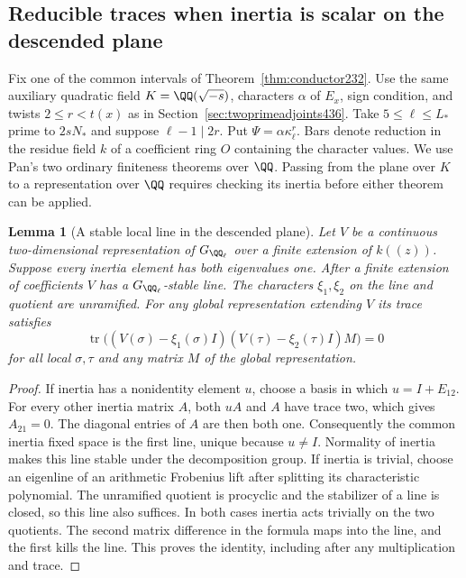 \documentclass[a4paper,11pt]{article}
\newtheorem{lemma}[proposition]{Lemma}
\theoremstyle{definition}
\theoremstyle{remark}
\numberwithin{equation}{section}
\begin{document}
\subsection{Reducible traces when inertia is scalar on the descended plane}
\label{sec:scalarinertiaplanes439}

Fix one of the common intervals of Theorem~\ref{thm:conductor232}.
Use the same auxiliary quadratic field \(K=\QQ(\sqrt{-s})\),
characters \(\alpha\) of \(E_x\), sign condition, and twists
\(2\le r<t(x)\) as in Section~\ref{sec:twoprimeadjoints436}.
Take \(5\le\ell\le L_*\) prime to \(2sN_*\) and suppose
\(\ell-1\mid 2r\). Put \(\Psi=\alpha\kappa_\ell^r\). Bars
denote reduction in the residue field \(k\) of a coefficient
ring \(O\) containing the character values. We use Pan's two
ordinary finiteness theorems over \(\QQ\). Passing from the
plane over \(K\) to a representation over \(\QQ\) requires
checking its inertia before either theorem can be applied.

\begin{lemma}[A stable local line in the descended plane]\leavevmode
\label{lem:unipotentplane439}
Let \(V\) be a continuous two-dimensional representation of
\(G_{\QQ_\ell}\) over a finite extension of \(k((z))\).
Suppose every inertia element has both eigenvalues one.
After a finite extension of coefficients \(V\) has a
\(G_{\QQ_\ell}\)-stable line. The characters \(\xi_1,\xi_2\)
on the line and quotient are unramified. For any global
representation extending \(V\) its trace satisfies
\[
  \operatorname{tr}\bigl((V(\sigma)-\xi_1(\sigma)I)
                  (V(\tau)-\xi_2(\tau)I)M\bigr)=0
\]
for all local \(\sigma,\tau\) and any matrix \(M\) of the
global representation.
\end{lemma}
\begin{proof}
If inertia has a nonidentity element \(u\), choose a basis
in which \(u=I+E_{12}\). For every other inertia matrix \(A\),
both \(uA\) and \(A\) have trace two, which gives \(A_{21}=0\).
The diagonal entries of \(A\) are then both one. Consequently
the common inertia fixed space is the first line, unique
because \(u\ne I\). Normality of inertia makes this line
stable under the decomposition group. If inertia is trivial,
choose an eigenline of an arithmetic Frobenius lift after
splitting its characteristic polynomial. The unramified
quotient is procyclic and the stabilizer of a line is closed,
so this line also suffices. In both cases inertia acts
trivially on the two quotients. The second matrix difference
in the formula maps into the line, and the first kills the
line. This proves the identity, including after any
multiplication and trace.
\end{proof}
\end{document}
